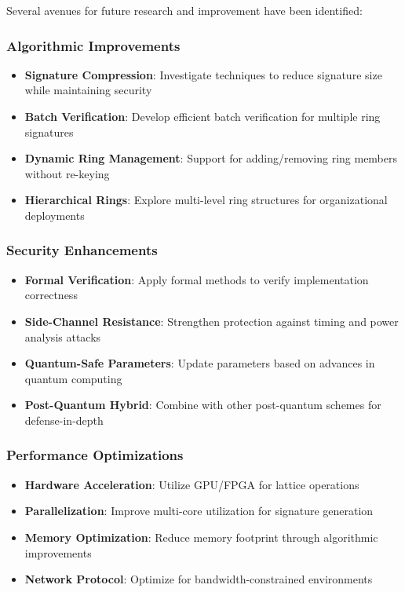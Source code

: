 \documentclass[11pt,a4paper]{article}
\begin{document}
Several avenues for future research and improvement have been identified:

\subsubsection{Algorithmic Improvements}

\begin{itemize}
\item \textbf{Signature Compression}: Investigate techniques to reduce signature size while maintaining security
\item \textbf{Batch Verification}: Develop efficient batch verification for multiple ring signatures
\item \textbf{Dynamic Ring Management}: Support for adding/removing ring members without re-keying
\item \textbf{Hierarchical Rings}: Explore multi-level ring structures for organizational deployments
\end{itemize}

\subsubsection{Security Enhancements}

\begin{itemize}
\item \textbf{Formal Verification}: Apply formal methods to verify implementation correctness
\item \textbf{Side-Channel Resistance}: Strengthen protection against timing and power analysis attacks
\item \textbf{Quantum-Safe Parameters}: Update parameters based on advances in quantum computing
\item \textbf{Post-Quantum Hybrid}: Combine with other post-quantum schemes for defense-in-depth
\end{itemize}

\subsubsection{Performance Optimizations}

\begin{itemize}
\item \textbf{Hardware Acceleration}: Utilize GPU/FPGA for lattice operations
\item \textbf{Parallelization}: Improve multi-core utilization for signature generation
\item \textbf{Memory Optimization}: Reduce memory footprint through algorithmic improvements
\item \textbf{Network Protocol}: Optimize for bandwidth-constrained environments
\end{itemize}
\end{document}
